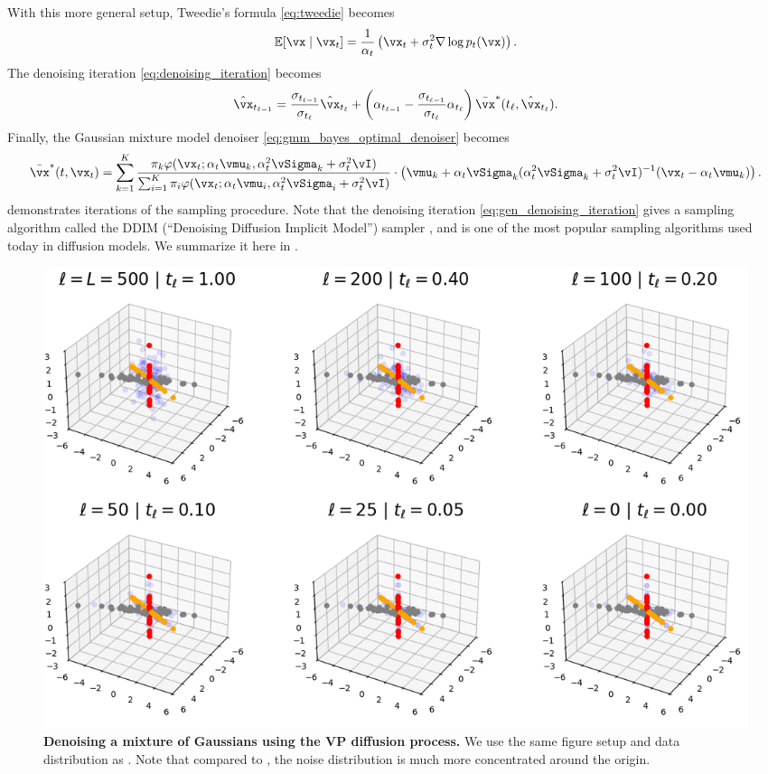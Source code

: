 \documentclass[../../book-main.tex]{subfiles}
\begin{document}
With this more general setup, Tweedie's formula \eqref{eq:tweedie} becomes 
\begin{equation}\label{eq:gen_tweedie}
	\Ex[\vx \mid \vx_{t}] = \frac{1}{\alpha_{t}}\bp{\vx_{t} + \sigma_{t}^{2}\nabla \log p_{t}(\vx)}.
\end{equation}
The denoising iteration \eqref{eq:denoising_iteration} becomes
\begin{equation}\label{eq:gen_denoising_iteration}
	\hat{\vx}_{t_{\ell - 1}} = \frac{\sigma_{t_{\ell - 1}}}{\sigma_{t_{\ell}}}\hat{\vx}_{t_{\ell}} + \bp{\alpha_{t_{\ell - 1}} - \frac{\sigma_{t_{\ell - 1}}}{\sigma_{t_{\ell}}}\alpha_{t_{\ell}}}\bar{\vx}^{\ast}(t_{\ell}, \hat{\vx}_{t_{\ell}}).
\end{equation}
Finally, the Gaussian mixture model denoiser \eqref{eq:gmm_bayes_optimal_denoiser} becomes 
\begin{equation}\label{eq:gen_gmm_bayes_optimal_denoiser}
	\bar{\vx}^{\ast}(t, \vx_{t}) = \sum_{k = 1}^{K}\frac{\pi_{k}\phi(\vx_{t}
	; \alpha_{t}\vmu_{k}, \alpha_{t}^{2}\vSigma_{k}
	+ \sigma_{t}^{2}\vI)}{\sum_{i = 1}^{K}\pi_{i}\phi(\vx_{t} ; \alpha_{t}\vmu_{i}, \alpha_{t}^{2}\vSigma_{i} + \sigma_{t}^{2}\vI)}\cdot\bp{\vmu_{k} + \alpha_{t}\vSigma_{k}(\alpha_{t}^{2}\vSigma_{k} + \sigma_{t}^{2}\vI)^{-1}(\vx_{t} - \alpha_{t}\vmu_{k})}.
\end{equation}
 demonstrates iterations of the sampling procedure. Note that the denoising iteration \eqref{eq:gen_denoising_iteration} gives a sampling algorithm called the DDIM (``Denoising Diffusion Implicit Model'') sampler \cite{song2020denoising}, and is one of the most popular sampling algorithms used today in diffusion models. We summarize it here in .

\begin{figure}
	\centering 
	\includegraphics[width=\textwidth]{chapters/chapter3/figs/vp_gmm_denoising.png}
	\caption{\small\textbf{Denoising a mixture of Gaussians using the VP diffusion process.} We use the same figure setup and data distribution as . Note that compared to , the noise distribution is much more concentrated around the origin.}
	\label{fig:vp_gmm_denoising}
\end{figure}
\end{document}
